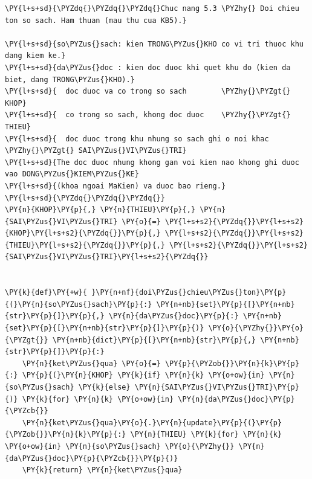 \begin{Verbatim}[commandchars=\\\{\},frame=single,framerule=0.3pt,rulecolor=\color{black!40},fontsize=\footnotesize,breaklines=true]
\PY{l+s+sd}{\PYZdq{}\PYZdq{}\PYZdq{}Chuc nang 5.3 \PYZhy{} Doi chieu ton so sach. Ham thuan (mau thu cua KB5).}

\PY{l+s+sd}{so\PYZus{}sach: kien TRONG\PYZus{}KHO co vi tri thuoc khu dang kiem ke.}
\PY{l+s+sd}{da\PYZus{}doc : kien doc duoc khi quet khu do (kien da biet, dang TRONG\PYZus{}KHO).}
\PY{l+s+sd}{  doc duoc va co trong so sach        \PYZhy{}\PYZgt{} KHOP}
\PY{l+s+sd}{  co trong so sach, khong doc duoc    \PYZhy{}\PYZgt{} THIEU}
\PY{l+s+sd}{  doc duoc trong khu nhung so sach ghi o noi khac \PYZhy{}\PYZgt{} SAI\PYZus{}VI\PYZus{}TRI}
\PY{l+s+sd}{The doc duoc nhung khong gan voi kien nao khong ghi duoc vao DONG\PYZus{}KIEM\PYZus{}KE}
\PY{l+s+sd}{(khoa ngoai MaKien) va duoc bao rieng.}
\PY{l+s+sd}{\PYZdq{}\PYZdq{}\PYZdq{}}
\PY{n}{KHOP}\PY{p}{,} \PY{n}{THIEU}\PY{p}{,} \PY{n}{SAI\PYZus{}VI\PYZus{}TRI} \PY{o}{=} \PY{l+s+s2}{\PYZdq{}}\PY{l+s+s2}{KHOP}\PY{l+s+s2}{\PYZdq{}}\PY{p}{,} \PY{l+s+s2}{\PYZdq{}}\PY{l+s+s2}{THIEU}\PY{l+s+s2}{\PYZdq{}}\PY{p}{,} \PY{l+s+s2}{\PYZdq{}}\PY{l+s+s2}{SAI\PYZus{}VI\PYZus{}TRI}\PY{l+s+s2}{\PYZdq{}}


\PY{k}{def}\PY{+w}{ }\PY{n+nf}{doi\PYZus{}chieu\PYZus{}ton}\PY{p}{(}\PY{n}{so\PYZus{}sach}\PY{p}{:} \PY{n+nb}{set}\PY{p}{[}\PY{n+nb}{str}\PY{p}{]}\PY{p}{,} \PY{n}{da\PYZus{}doc}\PY{p}{:} \PY{n+nb}{set}\PY{p}{[}\PY{n+nb}{str}\PY{p}{]}\PY{p}{)} \PY{o}{\PYZhy{}}\PY{o}{\PYZgt{}} \PY{n+nb}{dict}\PY{p}{[}\PY{n+nb}{str}\PY{p}{,} \PY{n+nb}{str}\PY{p}{]}\PY{p}{:}
    \PY{n}{ket\PYZus{}qua} \PY{o}{=} \PY{p}{\PYZob{}}\PY{n}{k}\PY{p}{:} \PY{p}{(}\PY{n}{KHOP} \PY{k}{if} \PY{n}{k} \PY{o+ow}{in} \PY{n}{so\PYZus{}sach} \PY{k}{else} \PY{n}{SAI\PYZus{}VI\PYZus{}TRI}\PY{p}{)} \PY{k}{for} \PY{n}{k} \PY{o+ow}{in} \PY{n}{da\PYZus{}doc}\PY{p}{\PYZcb{}}
    \PY{n}{ket\PYZus{}qua}\PY{o}{.}\PY{n}{update}\PY{p}{(}\PY{p}{\PYZob{}}\PY{n}{k}\PY{p}{:} \PY{n}{THIEU} \PY{k}{for} \PY{n}{k} \PY{o+ow}{in} \PY{n}{so\PYZus{}sach} \PY{o}{\PYZhy{}} \PY{n}{da\PYZus{}doc}\PY{p}{\PYZcb{}}\PY{p}{)}
    \PY{k}{return} \PY{n}{ket\PYZus{}qua}
\end{Verbatim}
